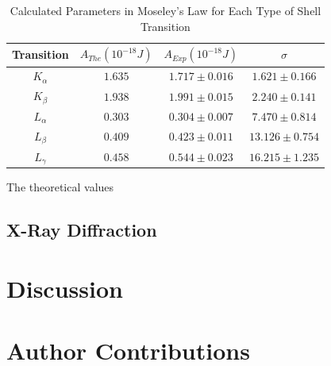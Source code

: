 \documentclass[%
 reprint,
 amsmath,amssymb,
 aps,
 pra,
]{revtex4-1}
\begin{document}
\begin{table}[htbp]
	\begin{center}
		\begin{tabular}{|c|c|c|c|}
			\hline Transition & $A_{The} (10^{-18} J)$  & $A_{Exp} (10^{-18} J) $ & $\sigma$ \\
			\hline $K_{\alpha}$ & $1.635$ & $1.717 \pm 0.016$ & $1.621 \pm 0.166$ \\
			\hline $K_{\beta}$ & $1.938$ & $1.991 \pm 0.015$ & $2.240 \pm 0.141$ \\
			\hline $L_{\alpha}$ & $0.303$ & $0.304 \pm 0.007$ & $7.470 \pm 0.814$ \\
			\hline $L_{\beta}$ & $0.409$ & $0.423 \pm 0.011$ & $13.126 \pm 0.754$ \\
			\hline $L_{\gamma}$ & $0.458$ & $0.544 \pm 0.023$ & $16.215 \pm 1.235$ \\
			\hline
		\end{tabular}
	\end{center}
	\caption{Calculated Parameters in Moseley's Law for Each Type of Shell Transition}
	\label{Tab:MoseLawSummary}
\end{table}

The theoretical values 

\subsection{X-Ray Diffraction}

\section{Discussion}

\section{Author Contributions}
\end{document}
